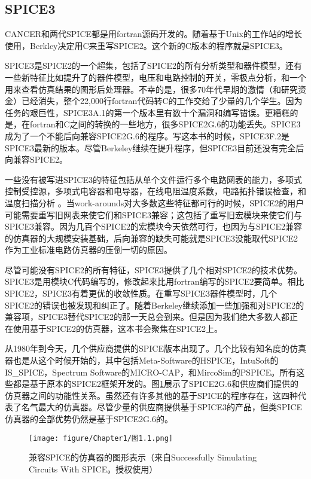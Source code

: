 \subsection{SPICE3}
CANCER和两代SPICE都是用fortran源码开发的。随着基于Unix的工作站的增长使用，Berkley决定用C来重写SPICE2。这个新的C版本的程序就是SPICE3。

SPICE3是SPICE2的一个超集，包括了SPICE2的所有分析类型和器件模型，还有一些新特征比如提升了的器件模型，电压和电路控制的开关，零极点分析，和一个用来查看仿真结果的图形后处理器。不幸的是，很多70年代早期的激情（和研究资金）已经消失，整个22,000行fortran代码转C的工作交给了少量的几个学生。因为任务的艰巨性，SPICE3A.1的第一个版本里有数十个漏洞和编写错误。更糟糕的是，在fortran和C之间的转换的一些地方，很多SPICE2G.6的功能丢失。SPICE3成为了一个不能后向兼容SPICE2G.6的程序。写这本书的时候，SPICE3F.2是SPICE3最新的版本。尽管Berkeley继续在提升程序，但SPICE3目前还没有完全后向兼容SPICE2。

一些没有被写进SPICE3的特征包括从单个文件运行多个电路网表的能力，多项式控制受控源，多项式电容器和电导器，在线电阻温度系数，电路拓扑错误检查，和温度扫描分析 \cite{SPICE3}。当work-arounds对大多数这些特征都可行的时候，SPICE2的用户可能需要重写旧网表来使它们和SPICE3兼容；这包括了重写旧宏模块来使它们与SPICE3兼容。因为几百个SPICE2的宏模块今天依然可行，也因为与SPICE2兼容的仿真器的大规模安装基础，后向兼容的缺失可能就是SPICE3没能取代SPICE2作为工业标准电路仿真器的压倒一切的原因。

尽管可能没有SPICE2的所有特征，SPICE3提供了几个相对SPICE2的技术优势。SPICE3是用模块C代码编写的，修改起来比用fortran编写的SPICE2要简单。相比SPICE2，SPICE3有着更优的收敛性质。在重写SPICE3器件模型时，几个SPICE2的错误也被发现和纠正了。随着Berkeley继续添加一些加强和对SPICE2的兼容项，SPICE3替代SPICE2的那一天总会到来。但是因为我们绝大多数人都正在使用基于SPICE2的仿真器，这本书会聚焦在SPICE2上。

从1980年到今天，几个供应商提供的SPICE版本出现了。几个比较有知名度的仿真器也是从这个时候开始的，其中包括Meta-Software的HSPICE，IntuSoft的IS\_{SPICE}，Spectrum Software的MICRO-CAP，和MircoSim的PSPICE。所有这些都是基于原本的SPICE2框架开发的。图\ref{图1.1}展示了SPICE2G.6和供应商们提供的仿真器之间的功能性关系。虽然还有许多其他的基于SPICE的程序存在，这四种代表了名气最大的仿真器。尽管少量的供应商提供基于SPICE3的产品，但类SPICE仿真器的全部优势仍然是基于SPICE2G.6的。
\begin{figure}[htbp]
\small
    \centering
    \texttt{[image: figure/Chapter1/图1.1.png]}
    \caption{兼容SPICE的仿真器的图形表示（来自Successfully Simulating Circuits With SPICE。授权使用）}
    \label{图1.1}
\end{figure}

